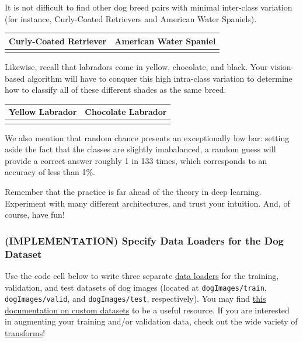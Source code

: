 \documentclass[11pt]{article}
\begin{document}
It is not difficult to find other dog breed pairs with minimal
inter-class variation (for instance, Curly-Coated Retrievers and
American Water Spaniels).

\begin{longtable}[]{@{}ll@{}}
\toprule
Curly-Coated Retriever & American Water Spaniel\tabularnewline
\midrule
\endhead
&\tabularnewline
\bottomrule
\end{longtable}

Likewise, recall that labradors come in yellow, chocolate, and black.
Your vision-based algorithm will have to conquer this high intra-class
variation to determine how to classify all of these different shades as
the same breed.

\begin{longtable}[]{@{}ll@{}}
\toprule
Yellow Labrador & Chocolate Labrador\tabularnewline
\midrule
\endhead
&\tabularnewline
\bottomrule
\end{longtable}

We also mention that random chance presents an exceptionally low bar:
setting aside the fact that the classes are slightly imabalanced, a
random guess will provide a correct answer roughly 1 in 133 times, which
corresponds to an accuracy of less than 1\%.

Remember that the practice is far ahead of the theory in deep learning.
Experiment with many different architectures, and trust your intuition.
And, of course, have fun!

\hypertarget{implementation-specify-data-loaders-for-the-dog-dataset}{%
\subsubsection{(IMPLEMENTATION) Specify Data Loaders for the Dog
Dataset}\label{implementation-specify-data-loaders-for-the-dog-dataset}}

Use the code cell below to write three separate
\href{http://pytorch.org/docs/stable/data.html\#torch.utils.data.DataLoader}{data
loaders} for the training, validation, and test datasets of dog images
(located at \texttt{dogImages/train}, \texttt{dogImages/valid}, and
\texttt{dogImages/test}, respectively). You may find
\href{http://pytorch.org/docs/stable/torchvision/datasets.html}{this
documentation on custom datasets} to be a useful resource. If you are
interested in augmenting your training and/or validation data, check out
the wide variety of
\href{http://pytorch.org/docs/stable/torchvision/transforms.html?highlight=transform}{transforms}!
\end{document}
